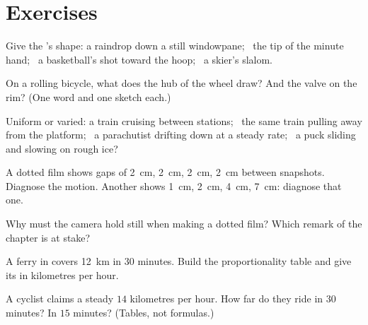 \section{Exercises}

\begin{exercise}[$\star$]\label{exo:g6:describing-motion:1}
Give the 's shape: a raindrop down a still windowpane;
\ the tip of the minute hand; \ a basketball's shot toward the
hoop; \ a skier's slalom.
\end{exercise}

\begin{exercise}[$\star$]\label{exo:g6:describing-motion:2}
On a rolling bicycle, what  does the hub of the wheel
draw? And the valve on the rim? (One word and one sketch each.)
\end{exercise}

\begin{exercise}[$\star$]\label{exo:g6:describing-motion:3}
Uniform or varied: a train cruising between stations; \ the same
train pulling away from the platform; \ a parachutist drifting
down at a steady rate; \ a puck sliding and slowing on rough ice?
\end{exercise}

\begin{exercise}[$\star$]\label{exo:g6:describing-motion:4}
A dotted film shows gaps of \qty{2}{cm}, \qty{2}{cm}, \qty{2}{cm},
\qty{2}{cm} between snapshots. Diagnose the motion. Another shows
\qty{1}{cm}, \qty{2}{cm}, \qty{4}{cm}, \qty{7}{cm}: diagnose that
one.
\end{exercise}

\begin{exercise}[$\star$]\label{exo:g6:describing-motion:5}
Why must the camera hold still when making a dotted film? Which
remark of the chapter is at stake?
\end{exercise}

\begin{exercise}[$\star$]\label{exo:g6:describing-motion:6}
A ferry in  covers \qty{12}{km} in $30$ minutes.
Build the proportionality table and give its  in kilometres
per hour.
\end{exercise}

\begin{exercise}[$\star$]\label{exo:g6:describing-motion:7}
A cyclist claims a steady $14$ kilometres per hour. How far do
they ride in $30$ minutes? In $15$ minutes? (Tables, not
formulas.)
\end{exercise}

